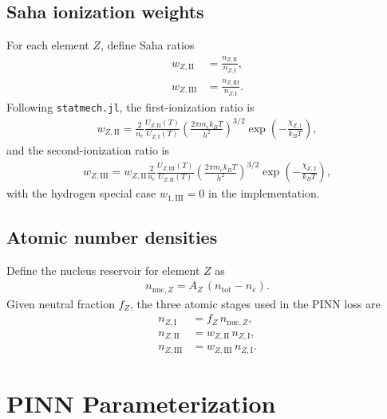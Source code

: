 \documentclass[11pt]{article}
\begin{document}
\subsection{Saha ionization weights}
For each element $Z$, define Saha ratios
\begin{align}
    w_{Z,\mathrm{II}} &= \frac{n_{Z,\mathrm{II}}}{n_{Z,\mathrm{I}}}, \\
    w_{Z,\mathrm{III}} &= \frac{n_{Z,\mathrm{III}}}{n_{Z,\mathrm{I}}}.
\end{align}
Following \texttt{statmech.jl}, the first-ionization ratio is
\begin{align}
    w_{Z,\mathrm{II}} =
    \frac{2}{n_e}
    \frac{U_{Z,\mathrm{II}}(T)}{U_{Z,\mathrm{I}}(T)}
    \left(\frac{2\pi m_e k_B T}{h^2}\right)^{3/2}
    \exp\!\left(-\frac{\chi_{Z,1}}{k_B T}\right),
\end{align}
and the second-ionization ratio is
\begin{align}
    w_{Z,\mathrm{III}} =
    w_{Z,\mathrm{II}}
    \frac{2}{n_e}
    \frac{U_{Z,\mathrm{III}}(T)}{U_{Z,\mathrm{II}}(T)}
    \left(\frac{2\pi m_e k_B T}{h^2}\right)^{3/2}
    \exp\!\left(-\frac{\chi_{Z,2}}{k_B T}\right),
\end{align}
with the hydrogen special case $w_{1,\mathrm{III}}=0$ in the implementation.

\subsection{Atomic number densities}
Define the nucleus reservoir for element $Z$ as
\begin{align}
    n_{\mathrm{nuc},Z} = A_Z\,(n_{\mathrm{tot}} - n_e).
\end{align}
Given neutral fraction $f_Z$, the three atomic stages used in the PINN loss are
\begin{align}
    n_{Z,\mathrm{I}} &= f_Z\, n_{\mathrm{nuc},Z}, \\
    n_{Z,\mathrm{II}} &= w_{Z,\mathrm{II}}\, n_{Z,\mathrm{I}}, \\
    n_{Z,\mathrm{III}} &= w_{Z,\mathrm{III}}\, n_{Z,\mathrm{I}}.
\end{align}

\section{PINN Parameterization}
\end{document}
